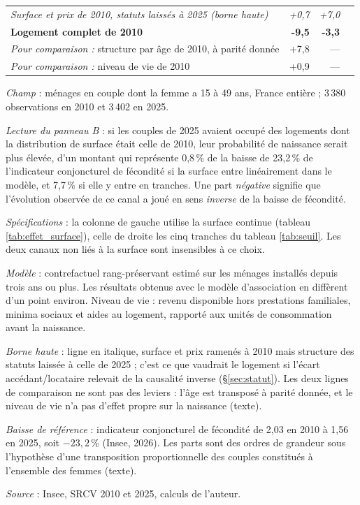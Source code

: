 \documentclass[12pt,a4paper]{article}
\begin{document}
\begin{table}[htbp]
\begin{threeparttable}
\begin{tabular}{lrrr}
			\textit{Surface et prix de 2010, statuts laissés à 2025 (borne haute)} & \textit{+0,7} & \textit{+7,0} & \\
			\textbf{Logement complet de 2010}              & \textbf{-9,5} & \textbf{-3,3} & \\
			\addlinespace
			\textit{Pour comparaison :} structure par âge de 2010, à parité donnée & +7,8 & --- & \\
			\textit{Pour comparaison :} niveau de vie de 2010     & +0,9 & --- & \\
			\bottomrule
		\end{tabular}
		\begin{tablenotes}[flushleft]\scriptsize
			\item \textit{Champ} : ménages en couple dont la femme a 15 à 49 ans, France entière ;
			3\,380 observations en 2010 et 3\,402 en 2025.
			\item \textit{Lecture du panneau B} : si les couples de 2025 avaient occupé des logements
			dont la distribution de surface était celle de 2010, leur probabilité de naissance serait
			plus élevée, d'un montant qui représente 0,8\,\% de la baisse de 23,2\,\% de l'indicateur
			conjoncturel de fécondité si la surface entre linéairement dans le modèle, et 7,7\,\% si
			elle y entre en tranches. Une part \textit{négative} signifie que l'évolution observée de
			ce canal a joué en sens \textit{inverse} de la baisse de fécondité.
			\item \textit{Spécifications} : la colonne de gauche utilise la surface continue
			(tableau \ref{tab:effet_surface}), celle de droite les cinq tranches du tableau
			\ref{tab:seuil}. Les deux canaux non liés à la surface sont insensibles à ce choix.
			\item \textit{Modèle} : contrefactuel rang-préservant estimé sur les ménages installés
			depuis trois ans ou plus. Les résultats obtenus avec le modèle d'association en
			diffèrent d'un point environ. Niveau de vie : revenu disponible hors prestations
			familiales, minima sociaux et aides au logement, rapporté aux unités de consommation
			avant la naissance.
			\item \textit{Borne haute} : ligne en italique, surface et prix ramenés à 2010 mais structure
			des statuts laissée à celle de 2025 ; c'est ce que vaudrait le logement si l'écart
			accédant/locataire relevait de la causalité inverse (§\ref{sec:statut}). Les deux lignes de
			comparaison ne sont pas des leviers : l'âge est transposé à parité donnée, et le niveau
			de vie n'a pas d'effet propre sur la naissance (texte).
			\item \textit{Baisse de référence} : indicateur conjoncturel de fécondité de 2,03 en 2010
			à 1,56 en 2025, soit $-23{,}2$\,\% (Insee, 2026). Les parts sont des ordres de grandeur
			sous l'hypothèse d'une transposition proportionnelle des couples constitués à l'ensemble
			des femmes (texte).
			\item \textit{Source} : Insee, SRCV 2010 et 2025, calculs de l'auteur.
		\end{tablenotes}
	\end{threeparttable}
\end{table}
\end{document}
